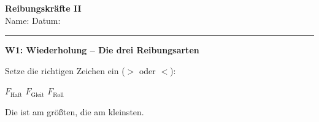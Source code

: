 \documentclass[11pt,a4paper]{article}
\newcommand{\luecke}[1]{\underline{\hspace{#1}}}
\begin{document}
\begin{minipage}[t]{0.80\textwidth}
    \vspace{0pt}
    {\Large\bfseries Reibungskräfte II}\\[0.2em]
    {\small Name: \luecke{4.5cm} \hfill Datum: \luecke{2.5cm}}
\end{minipage}
\hfill
\begin{minipage}[t]{0.15\textwidth}
    \vspace{0pt}
    \raggedleft
\end{minipage}
\vspace{0.1em}
\hrule
\vspace{0.4em}

\begin{merkkasten}
\textbf{W1: Wiederholung -- Die drei Reibungsarten}

\vspace{0.3em}
Setze die richtigen Zeichen ein ($>$ oder $<$):

\vspace{0.2em}
\begin{center}
{\large $F_{\text{Haft}}$ \luecke{1cm} $F_{\text{Gleit}}$ \luecke{1cm} $F_{\text{Roll}}$}
\end{center}

\vspace{0.2em}
Die \luecke{3cm} ist am größten, die \luecke{3cm} am kleinsten.
\end{merkkasten}

\vspace{0.3em}
\end{document}
